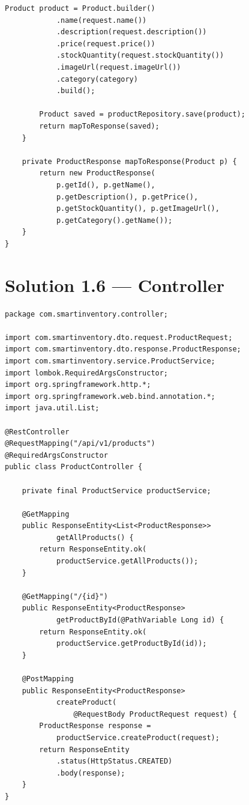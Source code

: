 \documentclass[12pt,a4paper]{report}
\begin{document}
\begin{lstlisting}[style=javastyle, title={service/impl/ProductServiceImpl.java}]
        Product product = Product.builder()
            .name(request.name())
            .description(request.description())
            .price(request.price())
            .stockQuantity(request.stockQuantity())
            .imageUrl(request.imageUrl())
            .category(category)
            .build();

        Product saved = productRepository.save(product);
        return mapToResponse(saved);
    }

    private ProductResponse mapToResponse(Product p) {
        return new ProductResponse(
            p.getId(), p.getName(),
            p.getDescription(), p.getPrice(),
            p.getStockQuantity(), p.getImageUrl(),
            p.getCategory().getName());
    }
}
\end{lstlisting}

\section{Solution 1.6 --- Controller}

\begin{lstlisting}[style=javastyle, title={controller/ProductController.java}]
package com.smartinventory.controller;

import com.smartinventory.dto.request.ProductRequest;
import com.smartinventory.dto.response.ProductResponse;
import com.smartinventory.service.ProductService;
import lombok.RequiredArgsConstructor;
import org.springframework.http.*;
import org.springframework.web.bind.annotation.*;
import java.util.List;

@RestController
@RequestMapping("/api/v1/products")
@RequiredArgsConstructor
public class ProductController {

    private final ProductService productService;

    @GetMapping
    public ResponseEntity<List<ProductResponse>>
            getAllProducts() {
        return ResponseEntity.ok(
            productService.getAllProducts());
    }

    @GetMapping("/{id}")
    public ResponseEntity<ProductResponse>
            getProductById(@PathVariable Long id) {
        return ResponseEntity.ok(
            productService.getProductById(id));
    }

    @PostMapping
    public ResponseEntity<ProductResponse>
            createProduct(
                @RequestBody ProductRequest request) {
        ProductResponse response =
            productService.createProduct(request);
        return ResponseEntity
            .status(HttpStatus.CREATED)
            .body(response);
    }
}
\end{lstlisting}
\end{document}
